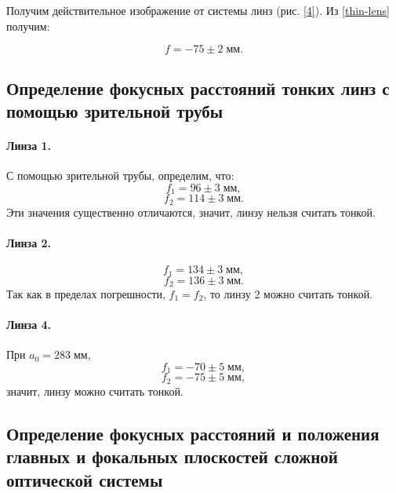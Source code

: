 \documentclass[a4paper]{article}
\newcommand{\picref}[1]{рис. \ref{#1}}
\begin{document}
Получим действительное изображение от системы линз (\picref{4}). Из \eqref{thin-lens} получим:

\begin{equation*}\label{key}
	f= -75\pm 2\; мм.
\end{equation*}

\subsection{Определение фокусных расстояний тонких линз с помощью зрительной трубы}

\paragraph{Линза 1.}

С помощью зрительной трубы, определим, что:
\begin{equation*}\label{key}
	f_1 = 96\pm 3 \; мм,
\end{equation*}
\begin{equation*}\label{key}
	f_2 = 114\pm 3 \; мм.
\end{equation*}
Эти значения существенно отличаются, значит, линзу нельзя считать тонкой.

\paragraph{Линза 2.}

\begin{equation*}\label{key}
	f_1 = 134\pm 3\; мм,
\end{equation*}
\begin{equation*}\label{key}
	f_2 = 136\pm 3\; мм.
\end{equation*}
Так как в пределах погрешности, $ f_1 = f_2 $, то линзу 2 можно считать тонкой.

\paragraph{Линза 4.}

При $ a_0 = 283 \; мм $,
\begin{equation*}\label{key}
	f_1 = -70\pm 5 \; мм,
\end{equation*}
\begin{equation*}\label{key}
	f_2 = -75\pm 5 \;мм,
\end{equation*}
значит, линзу можно считать тонкой.

\subsection{Определение фокусных расстояний и положения главных и фокальных плоскостей сложной оптической системы}
\end{document}
